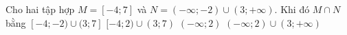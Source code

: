 \begin{ex}%
	Cho hai tập hợp $M=[-4;7]$ và $N=(-\infty;-2)\cup(3;+\infty)$. Khi đó $M\cap N$ bằng
	\choice
	{\True $[-4;-2)\cup (3;7]$}
	{$[-4;2)\cup (3;7)$}
	{$(-\infty;2)$}
	{$(-\infty;2)\cup (3;+\infty)$}
\end{ex}

